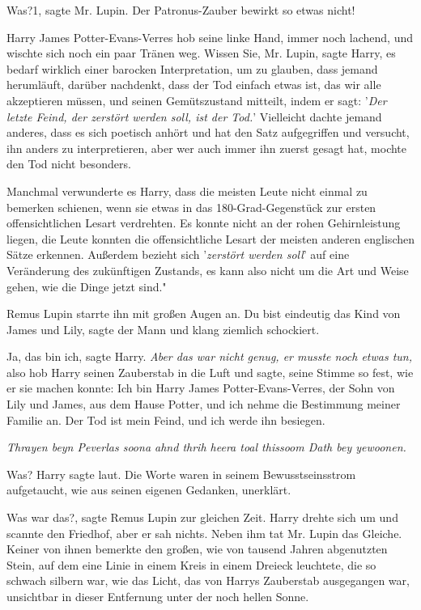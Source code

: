 \glqq{}Was?1\grqq{}, sagte Mr. Lupin. \glqq{}Der Patronus-Zauber bewirkt so etwas
nicht!\grqq{}

Harry James Potter-Evans-Verres hob seine linke Hand, immer noch lachend, und
wischte sich noch ein paar Tränen weg. \glqq{}Wissen Sie, Mr. Lupin\grqq{}, sagte
Harry, \glqq{}es bedarf wirklich einer barocken Interpretation, um zu glauben,
dass jemand herumläuft, darüber nachdenkt, dass der Tod einfach etwas ist, das
wir alle akzeptieren müssen, und seinen Gemütszustand mitteilt, indem er sagt:
'\emph{Der letzte Feind, der zerstört werden soll, ist der Tod.}' Vielleicht
dachte jemand anderes, dass es sich poetisch anhört und hat den Satz
aufgegriffen und versucht, ihn anders zu interpretieren, aber wer auch immer ihn
zuerst gesagt hat, mochte den Tod nicht besonders.\grqq{}

Manchmal verwunderte es Harry, dass die meisten Leute nicht einmal zu bemerken
schienen, wenn sie etwas in das 180-Grad-Gegenstück zur ersten offensichtlichen
Lesart verdrehten. Es konnte nicht an der rohen Gehirnleistung liegen, die Leute
konnten die offensichtliche Lesart der meisten anderen englischen Sätze
erkennen. \glqq{}Außerdem bezieht sich '\emph{zerstört werden soll}' auf eine
Veränderung des zukünftigen Zustands, es kann also nicht um die Art und Weise
gehen, wie die Dinge jetzt sind."

Remus Lupin starrte ihn mit großen Augen an. \glqq{}Du bist eindeutig das Kind
von James und Lily\grqq{}, sagte der Mann und klang ziemlich schockiert.

\glqq{}Ja, das bin ich\grqq{}, sagte Harry. \emph{Aber das war nicht genug, er
musste noch etwas tun,} also hob Harry seinen Zauberstab in die Luft und sagte,
seine Stimme so fest, wie er sie machen konnte: \glqq{}Ich bin Harry James
Potter-Evans-Verres, der Sohn von Lily und James, aus dem Hause Potter, und ich
nehme die Bestimmung meiner Familie an. Der Tod ist mein Feind, und ich werde
ihn besiegen.\grqq{}

\emph{Thrayen beyn Peverlas soona ahnd
thrih heera toal thissoom Dath bey yewoonen.}

\glqq{}Was?\grqq{} Harry sagte laut. Die Worte waren in seinem Bewusstseinsstrom
aufgetaucht, wie aus seinen eigenen Gedanken, unerklärt.

\glqq{}Was war das?\grqq{}, sagte Remus Lupin zur gleichen Zeit. Harry drehte
sich um und scannte den Friedhof, aber er sah nichts. Neben ihm tat Mr. Lupin
das Gleiche. Keiner von ihnen bemerkte den großen, wie von tausend Jahren
abgenutzten Stein, auf dem eine Linie in einem Kreis in einem Dreieck leuchtete,
die so schwach silbern war, wie das Licht, das von Harrys Zauberstab ausgegangen
war, unsichtbar in dieser Entfernung unter der noch hellen Sonne.

